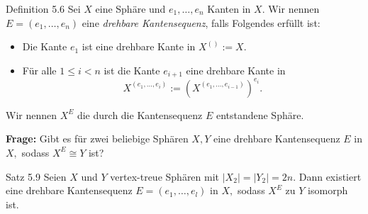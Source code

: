 \documentclass{beamer}
\begin{document}
\begin{comment}
\texttt{[image: fg8vortrag]}\\
\end{columns}
\end{frame}


\begin{frame}{Beispiel}

\begin{columns}
    \column{0.5\textwidth}
   \texttt{[image: facgraKan]}\\
   \texttt{[image: fgVortrag]}
    \column{0.5\textwidth}

\texttt{[image: Image\_fg8]}\\
\texttt{[image: Image\_fg9]}
\end{columns}
\end{frame}

\end{comment}
\begin{frame}
\begin{block}{Definition 5.6}
Sei $X$ eine Sphäre und $e_1,\ldots,e_n$ Kanten in $X$. Wir nennen $E=(e_1,\ldots,e_n)$ eine \emph{drehbare Kantensequenz}, falls Folgendes erfüllt ist: 
\begin{itemize}
\item Die Kante $e_1$ ist eine drehbare Kante in $X^{()}:=X.$ 
\item Für alle $1\leq i < n$ ist die Kante $e_{i+1}$ eine drehbare Kante in 
\[
X^{(e_1,\ldots,e_i)}:=(X^{(e_1,\ldots,e_{i-1})})^{e_i}.
\] 
\end{itemize}
Wir nennen $X^E$ die durch die Kantensequenz $E$ entstandene Sphäre. 
\end{block}
\end{frame}
\begin{frame}
\textbf{Frage:} Gibt es für zwei beliebige Sphären $X,Y$ eine drehbare Kantensequenz $E$ in $X,$ sodass $X^E\cong Y$ ist?
\end{frame}
\begin{frame}
\begin{block}{Satz 5.9}
Seien $X$ und $Y$ vertex-treue Sphären mit $\vert X_2\vert=\vert Y_2\vert=2n$.
Dann existiert eine drehbare Kantensequenz $E=(e_1,\ldots,e_l)$ in $X,$ sodass  $X^E$ zu $Y$ isomorph ist. 
\end{block}
\end{frame}
\end{document}
